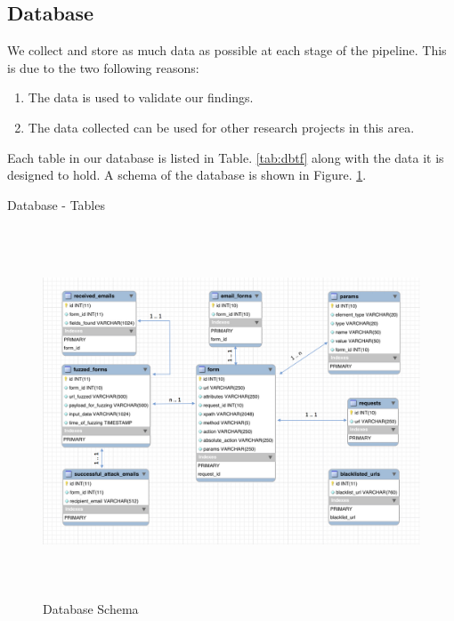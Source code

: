 \subsection{Database}
We collect and store as much data as possible at each stage of the pipeline. This is due to the two following reasons:
\begin{enumerate}
	\item The data is used to validate our findings.
	\item The data collected can be used for other research projects in this area.
\end{enumerate}
Each table in our database is listed in Table. \ref{tab:dbtf} along with the data it is designed to hold. A schema of the database is shown in Figure. \ref{fig:dbschema}.


\begin{table}[!htbp]
	\centering
	        
	\caption{Database - Tables}
	\label{tab:dbtf}
\end{table}

\begin{figure}[!htbp]
	\centering
	\includegraphics[width=15cm, height=11cm]{System/dbschema}
	\caption{Database Schema}
	\label{fig:dbschema}
\end{figure}

